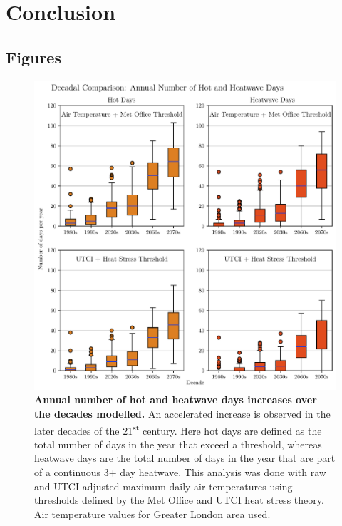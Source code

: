 \documentclass[10pt,letterpaper]{article}
\begin{document}
\section*{Conclusion}


\pagebreak






\pagebreak

\begin{adjustwidth}{-2.25in}{0in}
\section*{Figures}
\end{adjustwidth}

\begin{figure}[!h]
\begin{adjustwidth}{-2.25in}{0in}
    \begin{center}
        \includegraphics[width=0.87\linewidth]{./boxplots_slides.pdf}
    \end{center}
    \caption{
    {\bf Annual number of hot and heatwave days increases over the decades modelled.}
    An accelerated increase is observed in the later decades of the 21\textsuperscript{st} century.
    Here hot days are defined as the total number of days in the year that exceed a threshold, whereas heatwave days are the total number of days in the year that are part of a continuous 3+ day heatwave. This analysis was done with raw and UTCI adjusted maximum daily air temperatures using thresholds defined by the Met Office and UTCI heat stress theory. Air temperature values for Greater London area used.
    }
    \label{boxplots}
\end{adjustwidth}
\end{figure}
\end{document}
